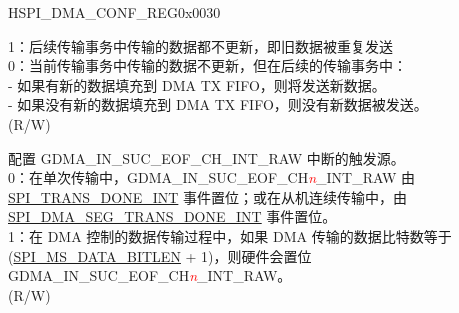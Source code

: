\begin{register}{H}{SPI\_DMA\_CONF\_REG}{0x0030}
\begin{regdesc}
\begin{reglist}
1：后续传输事务中传输的数据都不更新，即旧数据被重复发送\\
0：当前传输事务中传输的数据不更新，但在后续的传输事务中：\\
        - 如果有新的数据填充到 DMA TX FIFO，则将发送新数据。\\
        - 如果没有新的数据填充到 DMA TX FIFO，则没有新数据被发送。\\
(R/W)
\label{fielddesc:SPI3RXEOFEN}\item [SPI\_RX\_EOF\_EN] 配置 GDMA\_IN\_SUC\_EOF\_CH\_INT\_RAW 中断的触发源。\\
0：在单次传输中，GDMA\_IN\_SUC\_EOF\_CH\textcolor{red}{\it{n}}\_INT\_RAW 由 \hyperref[int:SPITRANSDONEINT]{SPI\_TRANS\_DONE\_INT} 事件置位；或在从机连续传输中，由 \hyperref[int:SPIDMASEGTRANSDONEINT]{SPI\_DMA\_SEG\_TRANS\_DONE\_INT} 事件置位。\\
 1：在 DMA 控制的数据传输过程中，如果 DMA 传输的数据比特数等于 (\hyperref[fielddesc:SPIMSDATABITLEN]{SPI\_MS\_DATA\_BITLEN} + 1)，则硬件会置位 GDMA\_IN\_SUC\_EOF\_CH\textcolor{red}{\it{n}}\_INT\_RAW。\\
(R/W)
 \item [见下页]
\end{reglist}\end{regdesc}
\end{register}

